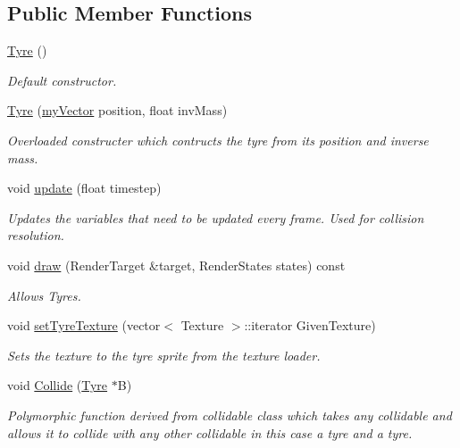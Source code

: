 \subsection*{Public Member Functions}
\begin{DoxyCompactItemize}
\item 
\hyperlink{class_tyre_a162dbaad7ae74443df530dfb147fb694}{Tyre} ()
\begin{DoxyCompactList}\small\item\em Default constructor. \end{DoxyCompactList}\item 
\hyperlink{class_tyre_a1908351bf7262df0b42b24f036af21ac}{Tyre} (\hyperlink{classmy_vector}{my\+Vector} position, float inv\+Mass)
\begin{DoxyCompactList}\small\item\em Overloaded constructer which contructs the tyre from its position and inverse mass. \end{DoxyCompactList}\item 
void \hyperlink{class_tyre_abdcd021058ef1c1821f472f79835e4ab}{update} (float timestep)
\begin{DoxyCompactList}\small\item\em Updates the variables that need to be updated every frame. Used for collision resolution. \end{DoxyCompactList}\item 
void \hyperlink{class_tyre_ae42e42ec7c444b97602fc4cda9f83480}{draw} (Render\+Target \&target, Render\+States states) const 
\begin{DoxyCompactList}\small\item\em Allows Tyres. \end{DoxyCompactList}\item 
void \hyperlink{class_tyre_ab66f2659c2384b6c608b5eb51bb50425}{set\+Tyre\+Texture} (vector$<$ Texture $>$\+::iterator Given\+Texture)
\begin{DoxyCompactList}\small\item\em Sets the texture to the tyre sprite from the texture loader. \end{DoxyCompactList}\item 
void \hyperlink{class_tyre_afc0a9733f7b94042a08be61e25e2d4d3}{Collide} (\hyperlink{class_tyre}{Tyre} $\ast$B)
\begin{DoxyCompactList}\small\item\em Polymorphic function derived from collidable class which takes any collidable and allows it to collide with any other collidable in this case a tyre and a tyre. \end{DoxyCompactList}\end{DoxyCompactItemize}
